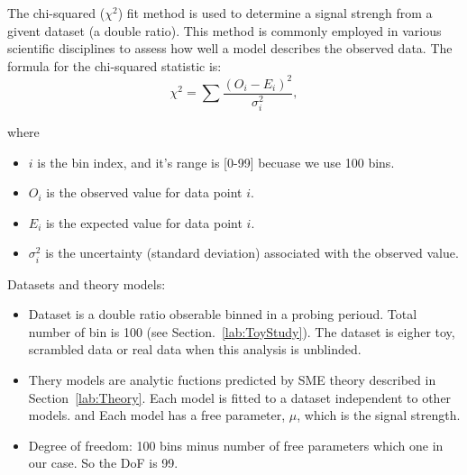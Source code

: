 \label{lab:DataScrambling_stat}


The chi-squared ($\chi^{2}$) fit method is used to determine a signal strengh from a givent
 dataset (a double ratio). This method is commonly employed in various scientific 
 disciplines to assess how well a model describes the observed data.
 The formula for the chi-squared statistic is:
 \begin{equation}
    \chi^2 = \sum \frac{(O_i - E_i)^2}{\sigma_i^2},
 \end{equation}

 where 
 \begin{itemize}
    \item $i$ is the bin index, and it's range is [0-99] becuase we use 100 bins.
    \item $O_i$ is the observed value for data point $i$.
    \item $E_i$ is the expected value for data point $i$.
    \item $\sigma_i^2$ is the uncertainty (standard deviation) associated with the observed value.
 \end{itemize}

Datasets and theory models:
\begin{itemize}
    \item Dataset is a  double ratio obserable binned in a probing perioud.
     Total number of bin is 100 (see Section.~\ref{lab:ToyStudy}). The dataset is eigher toy, scrambled data or real data when
     this analysis is unblinded.
    
     \item Thery models are analytic fuctions predicted by SME theory described in 
     Section~\ref{lab:Theory}. Each model is fitted to a dataset independent to other models.
     and Each model has a free parameter, $\mu$, which is the signal strength.
    
    \item Degree of freedom: 100 bins minus number of free parameters which one in our case.
     So the DoF is 99.
\end{itemize}
